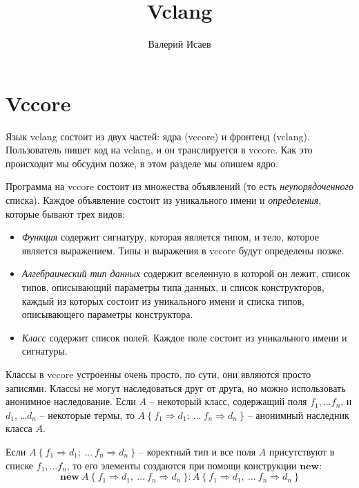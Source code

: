 \documentclass{amsart}
\theoremstyle{definition}
\theoremstyle{remark}
\newcommand{\red}{\Rightarrow}
\numberwithin{figure}{section}
\begin{document}
\title{Vclang}

\author{Валерий Исаев}


\maketitle

\section{Vccore}

Язык vclang состоит из двух частей: ядра (vccore) и фронтенд (vclang).
Пользователь пишет код на vclang, и он транслируется в vccore.
Как это происходит мы обсудим позже, в этом разделе мы опишем ядро.

Программа на vccore состоит из множества объявлений (то есть \emph{неупорядоченного} списка).
Каждое объявление состоит из уникального имени и \emph{определения}, которые бывают трех видов:
\begin{itemize}
\item \emph{Функция} содержит сигнатуру, которая является типом, и тело, которое является выражением. Типы и выражения в vccore будут определены позже.
\item \emph{Алгебраический тип данных} содержит вселенную в которой он лежит, список типов, описывающий параметры типа данных, и список конструкторов, каждый из которых состоит из уникального имени и списка типов, описывающего параметры конструктора.
\item \emph{Класс} содержит список полей. Каждое поле состоит из уникального имени и сигнатуры.
\end{itemize}
Классы в vccore устроенны очень просто, по сути, они являются просто записями.
Классы не могут наследоваться друг от друга, но можно использовать анонимное наследование.
Если $A$ -- некоторый класс, содержащий поля $f_1, \ldots f_n$, и $d_1$, \ldots $d_n$ -- некоторые термы, то $A\ \{\ f_1 \red d_1;\ \ldots\ f_n \red d_n\ \}$ -- анонимный наследник класса $A$.

Если $A\ \{\ f_1 \red d_1;\ \ldots\ f_n \red d_n\ \}$ -- коректный тип и все поля $A$ присутствуют в списке $f_1, \ldots f_n$, то его элементы создаются при помощи конструкции $\mathbf{new}$:
\[ \mathbf{new}\ A\ \{\ f_1 \red d_1,\ \ldots\ f_n \red d_n\ \} : A\ \{\ f_1 \red d_1,\ \ldots\ f_n \red d_n\ \} \]
\end{document}

